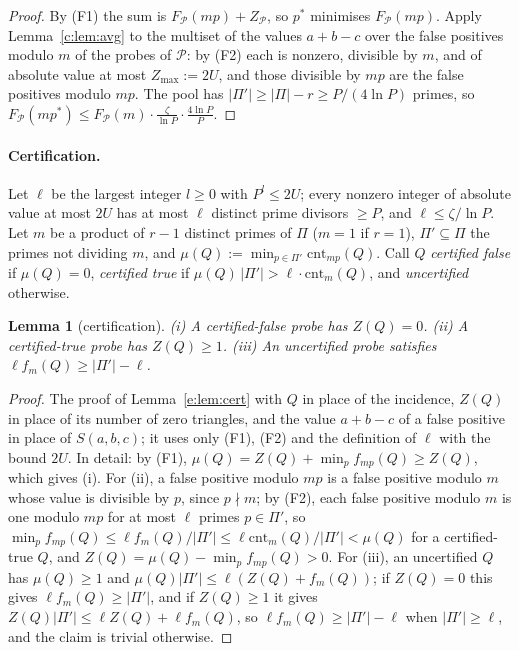 \documentclass[11pt]{article}
\newtheorem{lemma}[theorem]{Lemma}
\theoremstyle{definition}
\theoremstyle{remark}
\newcommand{\cnt}{\mathrm{cnt}}
\newcommand{\Pq}{\mathcal{P}}
\begin{document}
\begin{proof}
By (F1) the sum is $F_{\Pq}(mp)+Z_{\Pq}$, so $p^*$ minimises $F_{\Pq}(mp)$. Apply Lemma~\ref{c:lem:avg} to the multiset of the values $a+b-c$ over the false positives modulo $m$ of the probes of $\Pq$: by (F2) each is nonzero, divisible by $m$, and of absolute value at most $Z_{\max}:=2U$, and those divisible by $mp$ are the false positives modulo $mp$. The pool has $|\Pi'|\ge|\Pi|-r\ge P/(4\ln P)$ primes, so $F_{\Pq}(mp^*)\le F_{\Pq}(m)\cdot\frac{\zeta}{\ln P}\cdot\frac{4\ln P}P$.
\end{proof}

\paragraph{Certification.} Let $\ell$ be the largest integer $l\ge0$ with $P^l\le2U$; every nonzero integer of absolute value at most $2U$ has at most $\ell$ distinct prime divisors $\ge P$, and $\ell\le\zeta/\ln P$. Let $m$ be a product of $r-1$ distinct primes of $\Pi$ ($m=1$ if $r=1$), $\Pi'\subseteq\Pi$ the primes not dividing $m$, and $\mu(Q):=\min_{p\in\Pi'}\cnt_{mp}(Q)$. Call $Q$ \emph{certified false} if $\mu(Q)=0$, \emph{certified true} if $\mu(Q)\,|\Pi'|>\ell\cdot\cnt_m(Q)$, and \emph{uncertified} otherwise.

\begin{lemma}[certification]\label{b:lem:certA}
(i) A certified-false probe has $Z(Q)=0$. (ii) A certified-true probe has $Z(Q)\ge1$. (iii) An uncertified probe satisfies $\ell f_m(Q)\ge|\Pi'|-\ell$.
\end{lemma}

\begin{proof}
The proof of Lemma~\ref{e:lem:cert} with $Q$ in place of the incidence, $Z(Q)$ in place of its number of zero triangles, and the value $a+b-c$ of a false positive in place of $S(a,b,c)$; it uses only (F1), (F2) and the definition of $\ell$ with the bound $2U$. In detail: by (F1), $\mu(Q)=Z(Q)+\min_pf_{mp}(Q)\ge Z(Q)$, which gives (i). For (ii), a false positive modulo $mp$ is a false positive modulo $m$ whose value is divisible by $p$, since $p\nmid m$; by (F2), each false positive modulo $m$ is one modulo $mp$ for at most $\ell$ primes $p\in\Pi'$, so $\min_pf_{mp}(Q)\le\ell f_m(Q)/|\Pi'|\le\ell\cnt_m(Q)/|\Pi'|<\mu(Q)$ for a certified-true $Q$, and $Z(Q)=\mu(Q)-\min_pf_{mp}(Q)>0$. For (iii), an uncertified $Q$ has $\mu(Q)\ge1$ and $\mu(Q)|\Pi'|\le\ell(Z(Q)+f_m(Q))$; if $Z(Q)=0$ this gives $\ell f_m(Q)\ge|\Pi'|$, and if $Z(Q)\ge1$ it gives $Z(Q)|\Pi'|\le\ell Z(Q)+\ell f_m(Q)$, so $\ell f_m(Q)\ge|\Pi'|-\ell$ when $|\Pi'|\ge\ell$, and the claim is trivial otherwise.
\end{proof}
\end{document}
